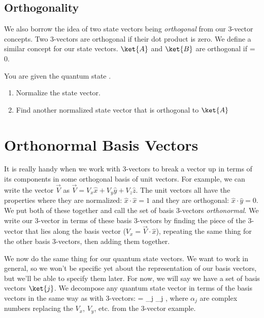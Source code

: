 \subsection{Orthogonality}
We also borrow the idea of two state vectors being {\em orthogonal} from our 3-vector concepts. Two 3-vectors are orthogonal if their dot product is zero. We define a similar concept for our state vectors. $\ket{A}$ and $\ket{B}$ are orthogonal if
\beq
{} = 0.
\eeq

\begin{exercise}
\label{ex:statevector}
You are given the quantum state 
\beq
{} \Meq {}.
\eeq
\begin{enumerate}
\item Normalize the state vector.
\item Find another normalized state vector that is orthogonal to $\ket{A}$
\end{enumerate}
\end{exercise}

\section{Orthonormal Basis Vectors}

It is really handy when we work with 3-vectors to break a vector up in terms of its components in some orthogonal basis of unit vectors. For example, we can write the vector $\vec{V}$ as $\vec{V} = V_x\hat{x} + V_y\hat{y} + V_z\hat{z}$.  The unit vectors all have the properties where they are normalized: $\hat{x}\cdot\hat{x}=1$ and they are orthogonal: $\hat{x}\cdot\hat{y}=0$. We put both of these together and call the set of basis 3-vectors {\em orthonormal}.
We write our 3-vector in terms of these basis 3-vectors by finding the piece of the 3-vector that lies along the basis vector ($V_x = \vec{V}\cdot\hat{x}$), repeating the same thing for the other basis 3-vectors, then adding them together.

We now do the same thing for our quantum state vectors. We want to work in general, so we won't be specific yet about the representation of our basis vectors, but we'll be able to specify them later. For now, we will say we have a set of basis vectors $\ket{j}$. We decompose any quantum state vector in terms of the basis vectors in the same way as with 3-vectors:
\beq
{} = \sum_j \alpha_j ,
\label{eq:decom}
\eeq
where $\alpha_j$ are complex numbers replacing the $V_x$, $V_y$, etc. from the 3-vector example.

